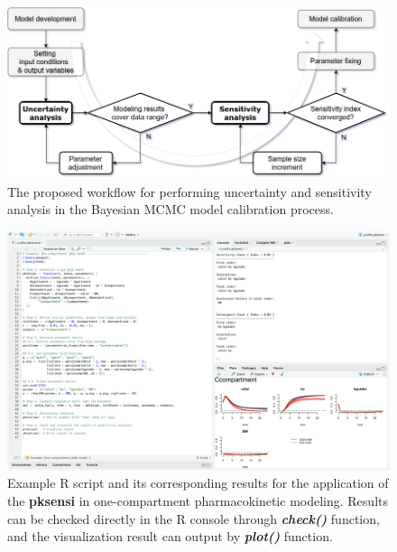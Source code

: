 \documentclass[preprint,12pt, a4paper]{elsarticle}
\begin{document}


 


\newpage

\clearpage
\newpage

\begin{landscape}

\begin{figure}
\includegraphics[width=1\linewidth]{workflow} 
\caption{The proposed workflow for performing uncertainty and sensitivity analysis in the Bayesian MCMC model calibration process.}
\label{fig:workflow}
\end{figure}

\clearpage
\newpage

\begin{figure}
\includegraphics[width=1\linewidth]{example-1} 
\caption{Example R script and its corresponding results for the application of the \textbf{pksensi} in one-compartment pharmacokinetic modeling. Results can be checked directly in the R console through \textit{\textbf{check()}} function, and the visualization result can output by \textit{\textbf{plot()}} function.}
\label{fig:example-1}
\end{figure}


\end{landscape}
\end{document}
